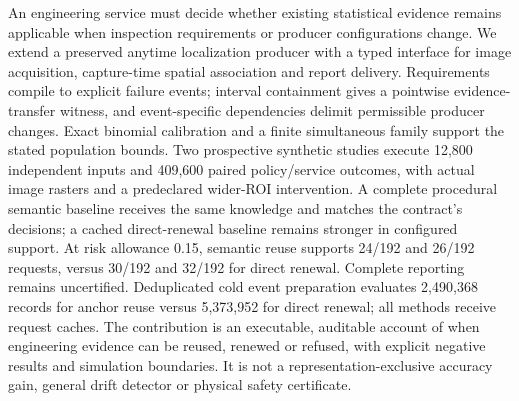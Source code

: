 An engineering service must decide whether existing statistical evidence remains applicable when inspection requirements or producer configurations change. We extend a preserved anytime localization producer with a typed interface for image acquisition, capture-time spatial association and report delivery. Requirements compile to explicit failure events; interval containment gives a pointwise evidence-transfer witness, and event-specific dependencies delimit permissible producer changes. Exact binomial calibration and a finite simultaneous family support the stated population bounds. Two prospective synthetic studies execute 12,800 independent inputs and 409,600 paired policy/service outcomes, with actual image rasters and a predeclared wider-ROI intervention. A complete procedural semantic baseline receives the same knowledge and matches the contract's decisions; a cached direct-renewal baseline remains stronger in configured support. At risk allowance 0.15, semantic reuse supports 24/192 and 26/192 requests, versus 30/192 and 32/192 for direct renewal. Complete reporting remains uncertified. Deduplicated cold event preparation evaluates 2,490,368 records for anchor reuse versus 5,373,952 for direct renewal; all methods receive request caches. The contribution is an executable, auditable account of when engineering evidence can be reused, renewed or refused, with explicit negative results and simulation boundaries. It is not a representation-exclusive accuracy gain, general drift detector or physical safety certificate.
